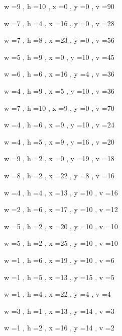 \documentclass[11pt]{article}
\begin{document}
w =9 , h =10 , x =0 , y =0 , v =90
\par
w =7 , h =4 , x =16 , y =0 , v =28
\par
w =7 , h =8 , x =23 , y =0 , v =56
\par
w =5 , h =9 , x =0 , y =10 , v =45
\par
w =6 , h =6 , x =16 , y =4 , v =36
\par
w =4 , h =9 , x =5 , y =10 , v =36
\par
w =7 , h =10 , x =9 , y =0 , v =70
\par
w =4 , h =6 , x =9 , y =10 , v =24
\par
w =4 , h =5 , x =9 , y =16 , v =20
\par
w =9 , h =2 , x =0 , y =19 , v =18
\par
w =8 , h =2 , x =22 , y =8 , v =16
\par
w =4 , h =4 , x =13 , y =10 , v =16
\par
w =2 , h =6 , x =17 , y =10 , v =12
\par
w =5 , h =2 , x =20 , y =10 , v =10
\par
w =5 , h =2 , x =25 , y =10 , v =10
\par
w =1 , h =6 , x =19 , y =10 , v =6
\par
w =1 , h =5 , x =13 , y =15 , v =5
\par
w =1 , h =4 , x =22 , y =4 , v =4
\par
w =3 , h =1 , x =13 , y =14 , v =3
\par
w =1 , h =2 , x =16 , y =14 , v =2
\par
\newpage
\end{document}
